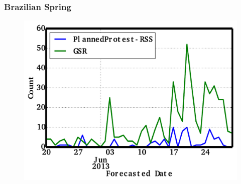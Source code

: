\documentclass[red,handout]{beamer}
\begin{document}
\begin{frame}
    \frametitle{Brazilian Spring}
    \begin{figure}
        \centering
        \includegraphics[scale=0.4]{brazil_june}
    \end{figure}
\end{frame}
\end{document}

